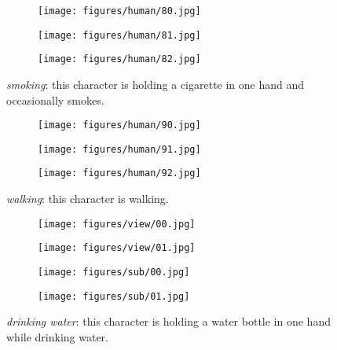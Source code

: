 \documentclass[runningheads]{llncs}
\begin{document}
\begin{figure}[h!]
  \centering
  \begin{subfigure}{0.99\textwidth}
    \texttt{[image: figures/human/80.jpg]}
\end{subfigure}
  \begin{subfigure}{0.99\textwidth}
    \texttt{[image: figures/human/81.jpg]}
\end{subfigure}
  \begin{subfigure}{0.99\textwidth}
    \texttt{[image: figures/human/82.jpg]}
\end{subfigure}
  \caption{\textit{smoking}: this character is holding a cigarette in one hand and occasionally smokes.}
  \label{fig:human_8}
\end{figure}

\begin{figure}[h!]
  \centering
  \begin{subfigure}{0.99\textwidth}
    \texttt{[image: figures/human/90.jpg]}
\end{subfigure}
  \begin{subfigure}{0.99\textwidth}
    \texttt{[image: figures/human/91.jpg]}
\end{subfigure}
  \begin{subfigure}{0.99\textwidth}
    \texttt{[image: figures/human/92.jpg]}
\end{subfigure}
  \caption{\textit{walking}: this character is walking.}
  \label{fig:human_9}
\end{figure}

\begin{figure}[h!]
  \centering
  \begin{subfigure}{0.99\textwidth}
    \texttt{[image: figures/view/00.jpg]}
\end{subfigure}
  \begin{subfigure}{0.99\textwidth}
    \texttt{[image: figures/view/01.jpg]}
\end{subfigure}
  \begin{subfigure}{0.99\textwidth}
    \texttt{[image: figures/sub/00.jpg]}
\end{subfigure}
  \begin{subfigure}{0.99\textwidth}
    \texttt{[image: figures/sub/01.jpg]}
\end{subfigure}
  \caption{\textit{drinking water}: this character is holding a water bottle in one hand while drinking water.}
  \label{fig:ntu_0}
\end{figure}
\end{document}
